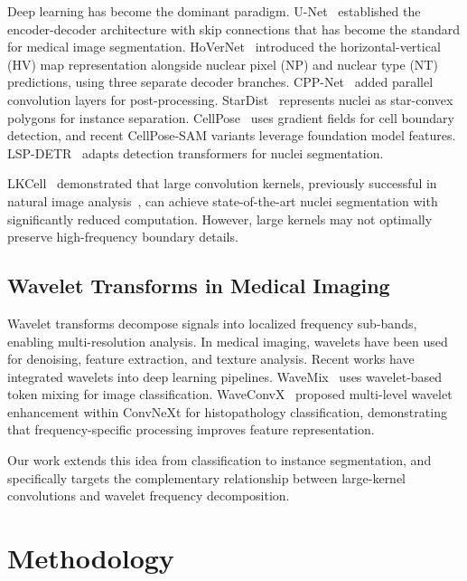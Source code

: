 \documentclass[conference]{IEEEtran}
\begin{document}
Deep learning has become the dominant paradigm. U-Net~\cite{unet} established the encoder-decoder architecture with skip connections that has become the standard for medical image segmentation. HoVerNet~\cite{hoevernet} introduced the horizontal-vertical (HV) map representation alongside nuclear pixel (NP) and nuclear type (NT) predictions, using three separate decoder branches. CPP-Net~\cite{cppnet} added parallel convolution layers for post-processing. StarDist~\cite{stardist} represents nuclei as star-convex polygons for instance separation. CellPose~\cite{cellpose} uses gradient fields for cell boundary detection, and recent CellPose-SAM variants leverage foundation model features. LSP-DETR~\cite{lsp_detr} adapts detection transformers for nuclei segmentation.

LKCell~\cite{lkcell} demonstrated that large convolution kernels, previously successful in natural image analysis~\cite{replknet, unireplknet}, can achieve state-of-the-art nuclei segmentation with significantly reduced computation. However, large kernels may not optimally preserve high-frequency boundary details.

\subsection{Wavelet Transforms in Medical Imaging}

Wavelet transforms decompose signals into localized frequency sub-bands, enabling multi-resolution analysis. In medical imaging, wavelets have been used for denoising, feature extraction, and texture analysis. Recent works have integrated wavelets into deep learning pipelines. WaveMix~\cite{wavemix} uses wavelet-based token mixing for image classification. WaveConvX~\cite{waveconvx} proposed multi-level wavelet enhancement within ConvNeXt for histopathology classification, demonstrating that frequency-specific processing improves feature representation.

Our work extends this idea from classification to instance segmentation, and specifically targets the complementary relationship between large-kernel convolutions and wavelet frequency decomposition.

\section{Methodology}
\label{sec:method}
\end{document}
